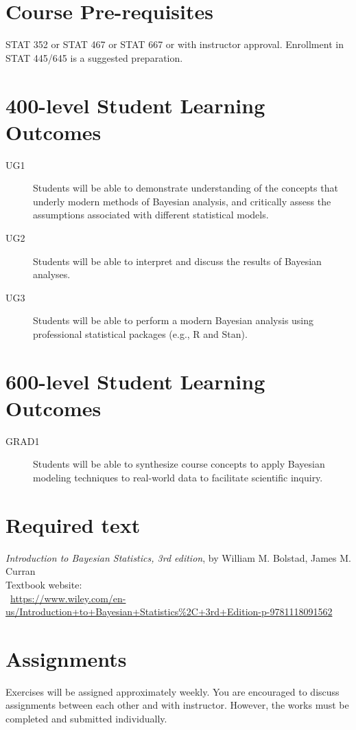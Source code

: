 \documentclass[11pt,onecolumn]{article}
\begin{document}
\section*{Course Pre-requisites}
STAT 352 or STAT 467 or STAT 667 or with instructor approval. Enrollment in STAT 445/645 is a suggested preparation.

\section*{400-level Student Learning Outcomes}
\begin{description}
\item[UG1] Students will be able to demonstrate understanding of the concepts that underly modern methods of Bayesian analysis, and critically assess the assumptions associated with different statistical models.
\item[UG2] Students will be able to interpret and discuss the results of Bayesian analyses.
\item[UG3] Students will be able to perform a modern Bayesian analysis using professional statistical packages (e.g., \textsf{R} and \textsf{Stan}).
\end{description}

\section*{600-level Student Learning Outcomes}
\begin{description}
\item[GRAD1] Students will be able to synthesize course concepts to apply Bayesian modeling techniques to real-world data to facilitate scientific inquiry.
\end{description}

\section*{Required text}
\emph{Introduction to Bayesian Statistics, 3rd edition}, by William M. Bolstad, James M. Curran\\
Textbook website:\\~\url{https://www.wiley.com/en-us/Introduction+to+Bayesian+Statistics%2C+3rd+Edition-p-9781118091562}

\section*{Assignments}
Exercises will be assigned approximately weekly. You are encouraged to discuss  assignments between each other and with instructor. However, the works must be completed and submitted individually.
\end{document}
